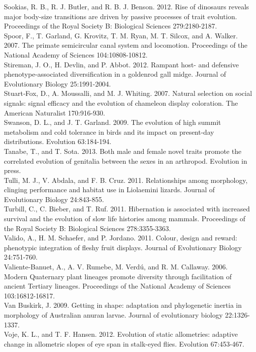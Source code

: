\documentclass[a4paper,12pt]{article}
\begin{document}
Sookias, R. B., R. J. Butler, and R. B. J. Benson. 2012. Rise of dinosaurs reveals major body-size transitions are driven by passive processes of trait evolution. Proceedings of the Royal Society B: Biological Sciences 279:2180-2187.\\
Spoor, F., T. Garland, G. Krovitz, T. M. Ryan, M. T. Silcox, and A. Walker. 2007. The primate semicircular canal system and locomotion. Proceedings of the National Academy of Sciences 104:10808-10812.\\
Stireman, J. O., H. Devlin, and P. Abbot. 2012. Rampant host- and defensive phenotype-associated diversification in a goldenrod gall midge. Journal of Evolutionary Biology 25:1991-2004.\\
Stuart‐Fox, D., A. Moussalli, and M. J. Whiting. 2007. Natural selection on social signals: signal efficacy and the evolution of chameleon display coloration. The American Naturalist 170:916-930.\\
Swanson, D. L., and J. T. Garland. 2009. The evolution of high summit metabolism and cold tolerance in birds and its impact on present-day distributions. Evolution 63:184-194.\\
Tanabe, T., and T. Sota. 2013. Both male and female novel traits promote the correlated evolution of genitalia between the sexes in an arthropod. Evolution in press.\\
Tulli, M. J., V. Abdala, and F. B. Cruz. 2011. Relationships among morphology, clinging performance and habitat use in Liolaemini lizards. Journal of Evolutionary Biology 24:843-855.\\
Turbill, C., C. Bieber, and T. Ruf. 2011. Hibernation is associated with increased survival and the evolution of slow life histories among mammals. Proceedings of the Royal Society B: Biological Sciences 278:3355-3363.\\
Valido, A., H. M. Schaefer, and P. Jordano. 2011. Colour, design and reward: phenotypic integration of fleshy fruit displays. Journal of Evolutionary Biology 24:751-760.\\
Valiente-Banuet, A., A. V. Rumebe, M. Verdú, and R. M. Callaway. 2006. Modern Quaternary plant lineages promote diversity through facilitation of ancient Tertiary lineages. Proceedings of the National Academy of Sciences 103:16812-16817.\\
Van Buskirk, J. 2009. Getting in shape: adaptation and phylogenetic inertia in morphology of Australian anuran larvae. Journal of evolutionary biology 22:1326-1337.\\
Voje, K. L., and T. F. Hansen. 2012. Evolution of static allometries: adaptive change in allometric slopes of eye span in stalk-eyed flies. Evolution 67:453-467.\\
\end{document}
